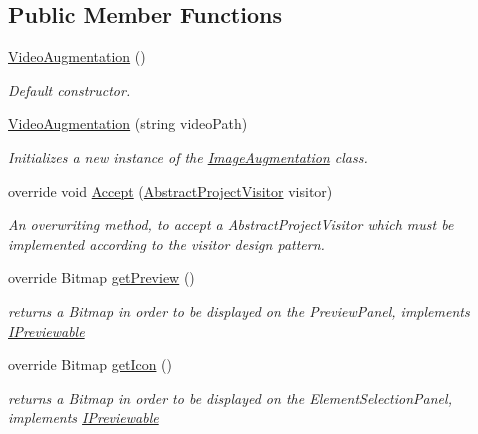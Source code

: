 \subsection*{Public Member Functions}
\begin{DoxyCompactItemize}
\item 
\hyperlink{class_a_rdev_kit_1_1_model_1_1_project_1_1_video_augmentation_a7f447fcc225f68f6b17ac7365cd9b33f}{Video\-Augmentation} ()
\begin{DoxyCompactList}\small\item\em Default constructor. \end{DoxyCompactList}\item 
\hyperlink{class_a_rdev_kit_1_1_model_1_1_project_1_1_video_augmentation_a38e4d291c9003b29aa5c94dff8fd9c3f}{Video\-Augmentation} (string video\-Path)
\begin{DoxyCompactList}\small\item\em Initializes a new instance of the \hyperlink{class_a_rdev_kit_1_1_model_1_1_project_1_1_image_augmentation}{Image\-Augmentation} class. \end{DoxyCompactList}\item 
override void \hyperlink{class_a_rdev_kit_1_1_model_1_1_project_1_1_video_augmentation_a7f23dea6de8cd95e5500e5000245d118}{Accept} (\hyperlink{class_a_rdev_kit_1_1_controller_1_1_project_controller_1_1_abstract_project_visitor}{Abstract\-Project\-Visitor} visitor)
\begin{DoxyCompactList}\small\item\em An overwriting method, to accept a Abstract\-Project\-Visitor which must be implemented according to the visitor design pattern. \end{DoxyCompactList}\item 
override Bitmap \hyperlink{class_a_rdev_kit_1_1_model_1_1_project_1_1_video_augmentation_a3d5968ace1fe7b6becfc10b60f573631}{get\-Preview} ()
\begin{DoxyCompactList}\small\item\em returns a Bitmap in order to be displayed on the Preview\-Panel, implements \hyperlink{interface_a_rdev_kit_1_1_model_1_1_project_1_1_i_previewable}{I\-Previewable} \end{DoxyCompactList}\item 
override Bitmap \hyperlink{class_a_rdev_kit_1_1_model_1_1_project_1_1_video_augmentation_ae41611da8c40607d32ab62d29c78a8ae}{get\-Icon} ()
\begin{DoxyCompactList}\small\item\em returns a Bitmap in order to be displayed on the Element\-Selection\-Panel, implements \hyperlink{interface_a_rdev_kit_1_1_model_1_1_project_1_1_i_previewable}{I\-Previewable} \end{DoxyCompactList}\item 

\end{DoxyCompactItemize}
